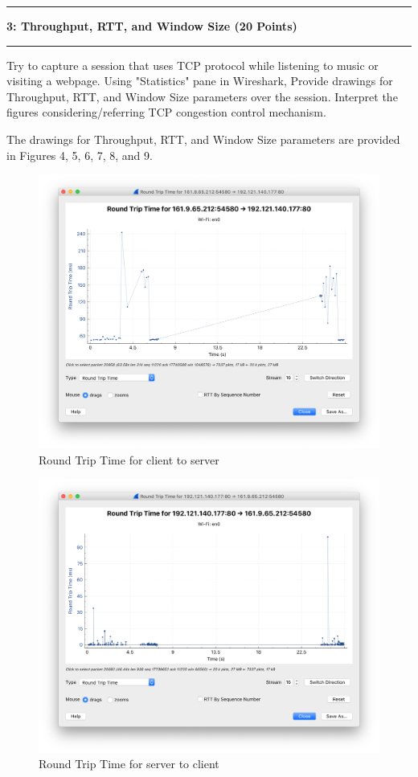 \documentclass[11pt]{article}
\newcommand\question[2]{\vspace{.25in}\hrule\textbf{#1: #2}\vspace{.5em}\hrule\vspace{.10in}}
\begin{document}
	
	\question{3}{Throughput, RTT, and Window Size (20 Points)}

	Try to capture a session that uses TCP protocol while listening to music or visiting a webpage. Using "Statistics" pane in Wireshark, Provide drawings for Throughput, RTT, and Window Size parameters over the session. Interpret the figures considering/referring TCP congestion control mechanism.
	
	The drawings for Throughput, RTT, and Window Size parameters are provided in Figures 4, 5, 6, 7, 8, and 9.
	
	\begin{figure}[H]
		\centering
		\includegraphics[width=0.7\linewidth]{rtt1}
		\caption{Round Trip Time for client to server}
	\end{figure}

	\begin{figure}[H]
		\centering
		\includegraphics[width=0.7\linewidth]{rtt2}
		\caption{Round Trip Time for server to client}
	\end{figure}
\end{document}

